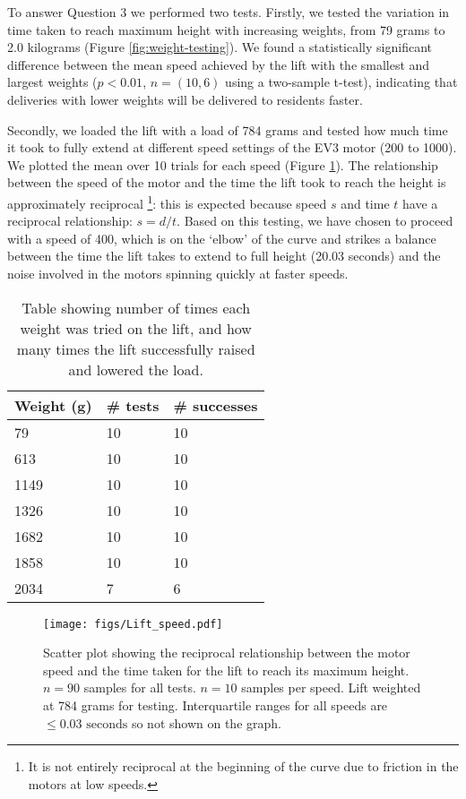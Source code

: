 \documentclass{article}
\begin{document}
To answer Question 3 we performed two tests. Firstly, we tested the variation in time taken to reach maximum height with increasing weights, from 79 grams to 2.0 kilograms (Figure \ref{fig:weight-testing}). We found a statistically significant difference between the mean speed achieved by the lift with the smallest and largest weights ($p < 0.01$, $n = (10, 6)$ using a two-sample t-test), indicating that deliveries with lower weights will be delivered to residents faster. 

Secondly, we loaded the lift with a load of 784 grams and tested how much time it took to fully extend at different speed settings of the EV3 motor (200 to 1000). We plotted the mean over 10 trials for each speed (Figure \ref{fig:speed-testing}). The relationship between the speed of the motor and the time the lift took to reach the height is approximately reciprocal \footnote{It is not entirely reciprocal at the beginning of the curve due to friction in the motors at low speeds.}: this is expected because speed $s$ and time $t$ have a reciprocal relationship: $s = d / t$. Based on this testing, we have chosen to proceed with a speed of 400, which is on the `elbow' of the curve and strikes a balance between the time the lift takes to extend to full height (20.03 seconds) and the noise involved in the motors spinning quickly at faster speeds.

\begin{table}
  \begin{center}
    \begin{tabular}{lll}
      {\bf Weight (g)} & {\bf \# tests} & {\bf \# successes} \\
      \hline
      79 &   10 & 10 \\
      613 &  10 & 10 \\
      1149 & 10 & 10 \\
      1326 & 10 & 10 \\
      1682 & 10 & 10 \\
      1858 & 10 & 10 \\
      2034 & 7 & 6
    \end{tabular}
    \caption{Table showing number of times each weight was tried on the lift, and how many times the lift successfully raised and lowered the load. }
    \label{tab:weight}
  \end{center}
\end{table}

\begin{figure}
  \begin{center}
    \texttt{[image: figs/Lift\_speed.pdf]}
    \caption{Scatter plot showing the reciprocal relationship between the motor speed and the time taken for the lift to reach its maximum height. $n = 90$ samples for all tests. $n = 10$ samples per speed. Lift weighted at 784 grams for testing. Interquartile ranges for all speeds are $\leq 0.03 \text{ seconds}$ so not shown on the graph.}
  \label{fig:speed-testing}
  \end{center}
\end{figure}
\end{document}
